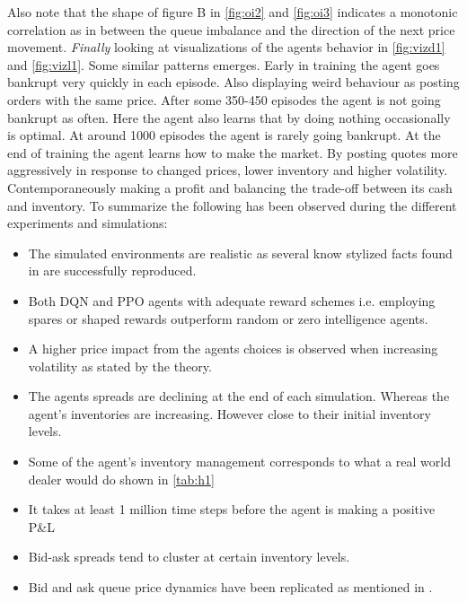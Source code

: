 \documentclass{kththesis}
\theoremstyle{definition}
\begin{document}
\newpage
Also note that the shape of figure B in \autoref{fig:oi2} and \autoref{fig:oi3} indicates a monotonic correlation as in \parencite{bouchaud2018trades} between the queue imbalance and the direction of the next price movement. 
\newline
\newline
\textit{Finally} looking at visualizations of the agents behavior in \autoref{fig:vizd1} and \autoref{fig:vizl1}. Some similar patterns emerges. Early in training the agent goes bankrupt very quickly in each episode. Also displaying weird behaviour as posting orders with the same price. After some 350-450 episodes the agent is not going bankrupt as often. Here the agent also learns that by doing nothing occasionally is optimal. At around 1000 episodes the agent is rarely going bankrupt. At the end of training the agent learns how to make the market. By posting quotes more aggressively in response to changed prices, lower inventory and higher volatility. Contemporaneously making a profit and balancing the trade-off between its cash and inventory. To summarize the following has been observed during the different experiments and simulations:
\begin{itemize}
    \item The simulated environments are realistic as several know stylized facts found in\parencite{cont2001empirical} are successfully reproduced. 
    
    \item Both DQN and PPO agents with adequate reward schemes i.e. employing spares or shaped rewards outperform random or zero intelligence agents.
    
    \item A  higher price impact from the agents choices is observed when increasing volatility as stated by the theory.
    
    \item The agents spreads are declining at the end of each simulation. Whereas the agent's inventories are increasing. However close to their initial inventory levels.
    
    \item Some of the agent's inventory management corresponds to what a real world dealer would do shown in \autoref{tab:h1}
    
    \item It takes at least 1 million time steps before the agent is making a positive P\&L
    
    \item Bid-ask spreads tend to cluster at certain inventory levels.
    
    \item Bid and ask queue price dynamics have been replicated as mentioned in \parencite{bouchaud2018trades}.
\end{itemize}
\end{document}
